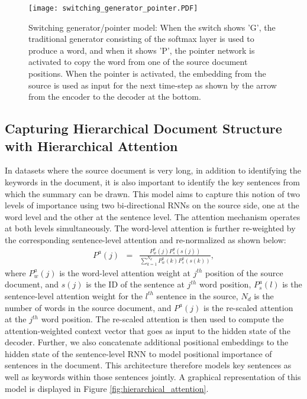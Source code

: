 \documentclass[11pt]{article}
\begin{document}
\begin{figure}[ht]
    \vspace{-0.3in}
	\centering
  \texttt{[image: switching\_generator\_pointer.PDF]}
  \vspace{-0.6in}
	\caption{{\small Switching generator/pointer model: When the switch shows 'G', the traditional generator consisting of the softmax layer is used to produce a word, and when it shows 'P', the pointer network is activated to copy the word from one of the source document positions. When the pointer is activated, the embedding from the source is used as input for the next time-step as shown by the arrow from the encoder to the decoder at the bottom.}}
	\label{fig:switching_generator_pointer}
\end{figure}

\subsection{Capturing Hierarchical Document Structure with Hierarchical Attention}\label{sec:hierarchical}
In datasets where the source document is very long, in addition to identifying the keywords in the document, it is also important to identify the key sentences from which the summary can be drawn. This model aims to capture this notion of two levels of importance using two bi-directional RNNs on the source side, one at the word level and the other at the sentence level. The attention mechanism operates at both levels simultaneously. The word-level attention is further re-weighted by the corresponding sentence-level attention and re-normalized as shown below:
\begin{eqnarray}
P^a(j) &=&  \frac{P^a_w(j)P^a_s(s(j))}{\sum_{k=1}^{N_d} P^a_w(k)P^a_s(s(k))},\nonumber
\end{eqnarray}
where $P^a_w(j)$ is the word-level attention weight at $j^{th}$ position of the source document, and $s(j)$ is the ID of the sentence at $j^{th}$ word position, $P^a_s(l)$ is the sentence-level attention weight for the $l^{th}$ sentence in the source, $N_d$ is the number of words in the source document, and $P^a(j)$ is the re-scaled attention at the  $j^{th}$ word position. The re-scaled attention is then used to compute the attention-weighted context vector that goes as input to the hidden state of the decoder. Further, we also concatenate additional positional embeddings to the hidden state of the sentence-level RNN to model positional importance of sentences in the document. This architecture therefore models key sentences as well as keywords within those sentences jointly. A graphical representation of this model is displayed in Figure \ref{fig:hierarchical_attention}. 
\end{document}

